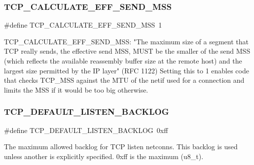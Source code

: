 \subsubsection{\texorpdfstring{T\+C\+P\+\_\+\+C\+A\+L\+C\+U\+L\+A\+T\+E\+\_\+\+E\+F\+F\+\_\+\+S\+E\+N\+D\+\_\+\+M\+SS}{TCP\_CALCULATE\_EFF\_SEND\_MSS}\hspace{0.1cm}{\footnotesize\ttfamily [2/2]}}
{\footnotesize\ttfamily \#define T\+C\+P\+\_\+\+C\+A\+L\+C\+U\+L\+A\+T\+E\+\_\+\+E\+F\+F\+\_\+\+S\+E\+N\+D\+\_\+\+M\+SS~1}

T\+C\+P\+\_\+\+C\+A\+L\+C\+U\+L\+A\+T\+E\+\_\+\+E\+F\+F\+\_\+\+S\+E\+N\+D\+\_\+\+M\+SS\+: "The maximum size of a segment that T\+CP really sends, the \textquotesingle{}effective send M\+SS,\textquotesingle{} M\+U\+ST be the smaller of the send M\+SS (which reflects the available reassembly buffer size at the remote host) and the largest size permitted by the IP layer" (R\+FC 1122) Setting this to 1 enables code that checks T\+C\+P\+\_\+\+M\+SS against the M\+TU of the netif used for a connection and limits the M\+SS if it would be too big otherwise. \mbox{\label{group__lwip__opts__tcp_ga93cce3f47e33df11248c908d1775bacf}} 
\subsubsection{\texorpdfstring{T\+C\+P\+\_\+\+D\+E\+F\+A\+U\+L\+T\+\_\+\+L\+I\+S\+T\+E\+N\+\_\+\+B\+A\+C\+K\+L\+OG}{TCP\_DEFAULT\_LISTEN\_BACKLOG}\hspace{0.1cm}{\footnotesize\ttfamily [1/2]}}
{\footnotesize\ttfamily \#define T\+C\+P\+\_\+\+D\+E\+F\+A\+U\+L\+T\+\_\+\+L\+I\+S\+T\+E\+N\+\_\+\+B\+A\+C\+K\+L\+OG~0xff}

The maximum allowed backlog for T\+CP listen netconns. This backlog is used unless another is explicitly specified. 0xff is the maximum (u8\+\_\+t). \mbox{\label{group__lwip__opts__tcp_ga93cce3f47e33df11248c908d1775bacf}} 
